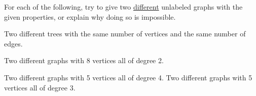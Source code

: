 \documentclass[12pt]{article}
\begin{document}
\begin{activity}
For each of the following, try to give two \underline{different} unlabeled graphs with the given properties, or explain why doing so is impossible.
\begin{questions}
\question Two different trees with the same number of vertices and the same number of edges.

\question Two different graphs with 8 vertices all of degree 2.

\question Two different graphs with 5 vertices all of degree 4.
\question Two different graphs with 5 vertices all of degree 3.




\end{questions}
\end{activity}
\end{document}
